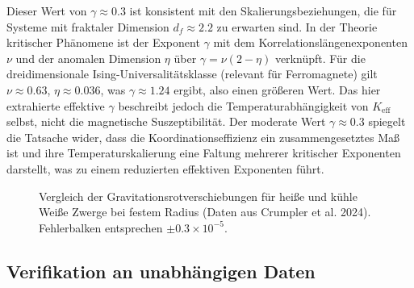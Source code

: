 \documentclass[12pt]{article}
\theoremstyle{remark}
\newcommand{\Keff}{K_{\mathrm{eff}}}
\newcommand{\df}{d_{\!f}}
\begin{document}
	Dieser Wert von $\gamma \approx 0.3$ ist konsistent mit den Skalierungsbeziehungen, die für Systeme mit fraktaler Dimension $\df \approx 2.2$ zu erwarten sind. In der Theorie kritischer Phänomene ist der Exponent $\gamma$ mit dem Korrelationslängenexponenten $\nu$ und der anomalen Dimension $\eta$ über $\gamma = \nu(2-\eta)$ verknüpft. Für die dreidimensionale Ising-Universalitätsklasse (relevant für Ferromagnete) gilt $\nu \approx 0.63$, $\eta \approx 0.036$, was $\gamma \approx 1.24$ ergibt, also einen größeren Wert. Das hier extrahierte effektive $\gamma$ beschreibt jedoch die Temperaturabhängigkeit von $\Keff$ selbst, nicht die magnetische Suszeptibilität. Der moderate Wert $\gamma \approx 0.3$ spiegelt die Tatsache wider, dass die Koordinationseffizienz ein zusammengesetztes Maß ist und ihre Temperaturskalierung eine Faltung mehrerer kritischer Exponenten darstellt, was zu einem reduzierten effektiven Exponenten führt.
	
	\begin{figure}[htbp]
		\centering
		\caption{Vergleich der Gravitationsrotverschiebungen für heiße und kühle Weiße Zwerge bei festem Radius (Daten aus Crumpler et al. 2024). Fehlerbalken entsprechen $\pm0.3\times10^{-5}$.}
		\label{fig:wd-redshift}
	\end{figure}
	
	\subsection{Verifikation an unabhängigen Daten}
	\label{subsec:wd-verification}
	
\end{document}
